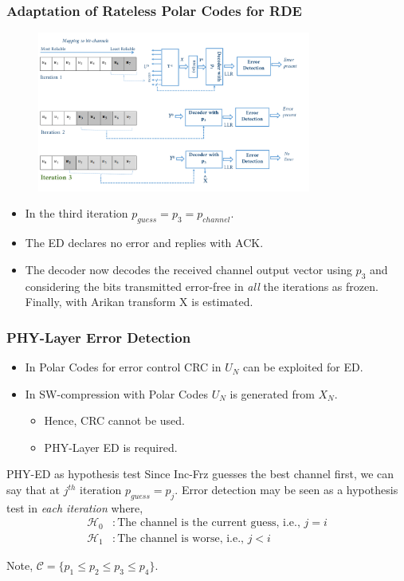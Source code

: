 \documentclass[xcolor=dvipsnames]{beamer}
\begin{document}
\begin{frame}[label=adapt3]
\frametitle{Adaptation of Rateless Polar Codes for RDE}
\begin{figure}[h]
 \begin{center}
    \includegraphics[width=9cm]{iswrpcp3.png}
  \end{center}
  \label{fig:iswrpc}
\end{figure}
\begin{itemize}
\item In the third iteration $p_{guess}=p_3=p_{channel}$.
\item The ED declares no error and replies with ACK. 
\item The decoder now  decodes the received channel output vector using $p_3$ and considering the bits transmitted error-free in \emph{all} the iterations as frozen. Finally, with Arikan transform X is estimated.
\end{itemize}
\end{frame}
\begin{frame}[label=phyed]
\frametitle{PHY-Layer Error Detection}
\begin{itemize}
\item In Polar Codes for error control CRC in $U_N$ can be exploited for ED.
\item In SW-compression with Polar Codes $U_N$ is generated from $X_N$.
\begin{itemize}
\item Hence, CRC cannot be used.
\item PHY-Layer ED is required.
\end{itemize}
\end{itemize}
\begin{block}{PHY-ED as hypothesis test}
Since Inc-Frz guesses the best channel first, we can say that at $j^{th}$ iteration $p_{guess}=p_j$. 
Error detection may be seen as a hypothesis test in \emph{each iteration} where,
\begin{align*}
\mathcal{H}_0 & :\text{The channel is the current guess, i.e., } j=i\\
\mathcal{H}_1 & :\text{The channel is worse, i.e., }j<i
\end{align*}
\vspace{0.1cm}
\end{block}
\vspace{0.5cm}
\tiny Note, $\mathcal{C}=\{ p_1 \leq p_2 \leq p_3 \leq p_4\}$.
\end{frame}
\end{document}
